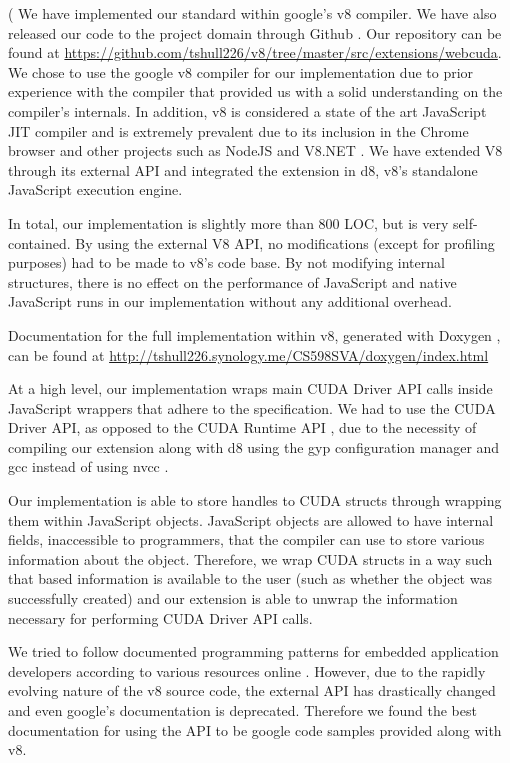 

(
We have implemented our \name standard within google's v8 \cite{v8} compiler. We
have also released our code to the project domain through Github \cite{github}.
Our repository can be found at
\url{https://github.com/tshull226/v8/tree/master/src/extensions/webcuda}.  We chose to use
the google v8  compiler for our implementation due to prior experience with the
compiler that provided us with a solid understanding on the compiler's
internals. In addition, v8 is considered a state of the art JavaScript JIT
compiler and is extremely prevalent due to its inclusion in the Chrome browser
\cite{chrome} and other projects such as NodeJS \cite{nodeJS} and V8.NET
\cite{V8.NET}. We have extended V8 through its external API and integrated the
extension in d8, v8's standalone JavaScript execution engine. 

In total, our implementation is slightly more than 800 LOC, but is very
self-contained. By using the external V8 API, no modifications (except for
profiling purposes) had to be made to v8's code base. By not modifying internal
structures, there is no effect on the performance of JavaScript and native
JavaScript runs in our implementation without any additional overhead.

Documentation for the full \name implementation within v8,
generated with Doxygen \cite{doxygen}, can be found at
\url{http://tshull226.synology.me/CS598SVA/doxygen/index.html}

At a high level, our implementation wraps main CUDA Driver API
\cite{cudaDriverAPI} calls inside JavaScript wrappers that adhere to the \name
specification. We had to use the CUDA Driver API, as opposed to the CUDA Runtime
API \cite{cudaRuntimeAPI}, due to the necessity of compiling our extension along
with d8 using the gyp \cite{gyp} configuration manager and gcc
\cite{gcc} instead of using nvcc \cite{nvcc}.

Our implementation is able to store handles to CUDA structs through wrapping them
within JavaScript objects. JavaScript objects are allowed to have internal
fields, inaccessible to programmers, that the compiler can use to store various
information about the object. Therefore, we wrap CUDA structs in a way such that
based information is available to the user (such as whether the object was
successfully created) and our extension is able to unwrap the information
necessary for performing CUDA Driver API calls.

We tried to follow documented programming patterns for embedded application
developers according to various resources online
\cite{embeddersGuide, nodeJSDocumentation}. However, due to the rapidly evolving
nature of the v8 source code, the external API has drastically changed and even
google's documentation \cite{embeddersGuide} is deprecated. Therefore we found
the best documentation for using the API to be google code samples provided
along with v8.

